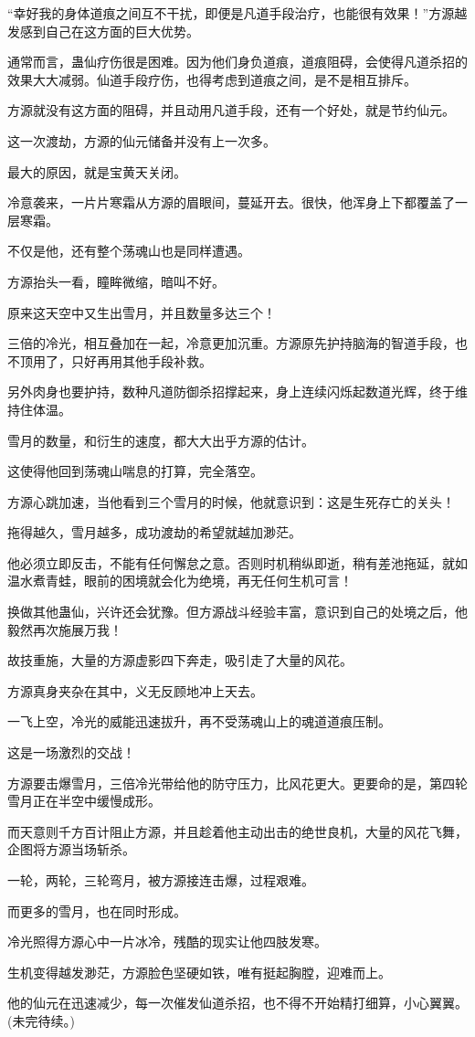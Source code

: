 \begin{this_body}
“幸好我的身体道痕之间互不干扰，即便是凡道手段治疗，也能很有效果！”方源越发感到自己在这方面的巨大优势。

通常而言，蛊仙疗伤很是困难。因为他们身负道痕，道痕阻碍，会使得凡道杀招的效果大大减弱。仙道手段疗伤，也得考虑到道痕之间，是不是相互排斥。

方源就没有这方面的阻碍，并且动用凡道手段，还有一个好处，就是节约仙元。

这一次渡劫，方源的仙元储备并没有上一次多。

最大的原因，就是宝黄天关闭。

冷意袭来，一片片寒霜从方源的眉眼间，蔓延开去。很快，他浑身上下都覆盖了一层寒霜。

不仅是他，还有整个荡魂山也是同样遭遇。

方源抬头一看，瞳眸微缩，暗叫不好。

原来这天空中又生出雪月，并且数量多达三个！

三倍的冷光，相互叠加在一起，冷意更加沉重。方源原先护持脑海的智道手段，也不顶用了，只好再用其他手段补救。

另外肉身也要护持，数种凡道防御杀招撑起来，身上连续闪烁起数道光辉，终于维持住体温。

雪月的数量，和衍生的速度，都大大出乎方源的估计。

这使得他回到荡魂山喘息的打算，完全落空。

方源心跳加速，当他看到三个雪月的时候，他就意识到：这是生死存亡的关头！

拖得越久，雪月越多，成功渡劫的希望就越加渺茫。

他必须立即反击，不能有任何懈怠之意。否则时机稍纵即逝，稍有差池拖延，就如温水煮青蛙，眼前的困境就会化为绝境，再无任何生机可言！

换做其他蛊仙，兴许还会犹豫。但方源战斗经验丰富，意识到自己的处境之后，他毅然再次施展万我！

故技重施，大量的方源虚影四下奔走，吸引走了大量的风花。

方源真身夹杂在其中，义无反顾地冲上天去。

一飞上空，冷光的威能迅速拔升，再不受荡魂山上的魂道道痕压制。

这是一场激烈的交战！

方源要击爆雪月，三倍冷光带给他的防守压力，比风花更大。更要命的是，第四轮雪月正在半空中缓慢成形。

而天意则千方百计阻止方源，并且趁着他主动出击的绝世良机，大量的风花飞舞，企图将方源当场斩杀。

一轮，两轮，三轮弯月，被方源接连击爆，过程艰难。

而更多的雪月，也在同时形成。

冷光照得方源心中一片冰冷，残酷的现实让他四肢发寒。

生机变得越发渺茫，方源脸色坚硬如铁，唯有挺起胸膛，迎难而上。

他的仙元在迅速减少，每一次催发仙道杀招，也不得不开始精打细算，小心翼翼。(未完待续。)

\end{this_body}

